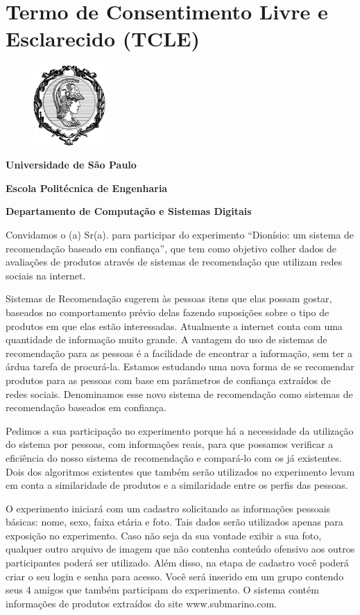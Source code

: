 \appendix
\chapter {Termo de Consentimento Livre e Esclarecido (TCLE)}
\label{cha:TCLE}

\begin{figure}[ht]
  \centering
  \includegraphics[width=2.76cm]{imagens/minerva.png}
\end{figure}
\centerline{\textbf{Universidade de São Paulo}}
\centerline{\textbf{Escola Politécnica de Engenharia}}
\centerline{\textbf{Departamento de Computação e Sistemas Digitais}}
\vspace{0.3in}
 Convidamos o (a) Sr(a). para participar do experimento “Dionísio: um sistema de recomendação baseado em confiança”, que tem como objetivo colher dados de avaliações de produtos através de sistemas de recomendação que utilizam redes sociais na internet.

 Sistemas de Recomendação sugerem às pessoas itens que elas possam gostar, baseados no comportamento prévio delas fazendo suposições sobre o tipo de produtos em que elas estão interessadas. Atualmente a internet conta com uma quantidade de informação muito grande. A vantagem do uso de sistemas de recomendação para as pessoas é a facilidade de encontrar a informação, sem ter a árdua tarefa de procurá-la. Estamos estudando uma nova forma de se recomendar produtos para as pessoas com base em parâmetros de confiança extraídos de redes sociais. Denominamos esse novo sistema de recomendação como sistemas de recomendação baseados em confiança.
	
 Pedimos a sua participação no experimento porque há a necessidade da utilização do sistema por pessoas, com informações reais, para que possamos verificar a eficiência do nosso sistema de recomendação e compará-lo com os já existentes. Dois dos algoritmos existentes que também serão utilizados no experimento levam em conta a similaridade de produtos e a similaridade entre os perfis das pessoas.

 O experimento iniciará com um cadastro solicitando as informações pessoais básicas: nome, sexo, faixa etária e foto. Tais dados serão utilizados apenas para exposição no experimento. Caso não seja da sua vontade exibir a sua foto, qualquer outro arquivo de imagem que não contenha conteúdo ofensivo aos outros participantes poderá ser utilizado. Além disso, na etapa de cadastro você poderá criar o seu login e senha para acesso. Você será inserido em um grupo contendo seus 4 amigos que também participam do experimento. O sistema contém informações de produtos extraídos do site www.submarino.com.

